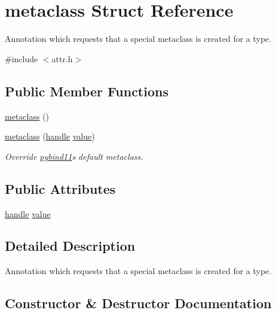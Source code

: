 \hypertarget{structmetaclass}{}\section{metaclass Struct Reference}
\label{structmetaclass}


Annotation which requests that a special metaclass is created for a type.  




{\ttfamily \#include $<$attr.\+h$>$}

\subsection*{Public Member Functions}
\begin{DoxyCompactItemize}
\item 
\mbox{\hyperlink{structmetaclass_a12791e30173737e4d565d705f1e41779}{metaclass}} ()
\item 
\mbox{\hyperlink{structmetaclass_a315277a15107c2eb0136076274cdcee9}{metaclass}} (\mbox{\hyperlink{classhandle}{handle}} \mbox{\hyperlink{_s_d_l__opengl__glext_8h_a8ad81492d410ff2ac11f754f4042150f}{value}})
\begin{DoxyCompactList}\small\item\em Override \mbox{\hyperlink{namespacepybind11}{pybind11}}\textquotesingle{}s default metaclass. \end{DoxyCompactList}\end{DoxyCompactItemize}
\subsection*{Public Attributes}
\begin{DoxyCompactItemize}
\item 
\mbox{\hyperlink{classhandle}{handle}} \mbox{\hyperlink{structmetaclass_a19bbd12d205e469e2df2a7b4070cbdd4}{value}}
\end{DoxyCompactItemize}


\subsection{Detailed Description}
Annotation which requests that a special metaclass is created for a type. 

\subsection{Constructor \& Destructor Documentation}
\mbox{\label{structmetaclass_a12791e30173737e4d565d705f1e41779}} 
